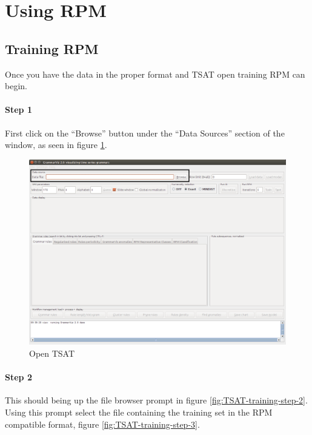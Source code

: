 \documentclass[letterpaper, 12pt]{article}
\begin{document}
\newpage
\section{Using RPM}

\subsection{Training RPM}
Once you have the data in the proper format and TSAT open training RPM can begin.

\paragraph{Step 1}
First click on the ``Browse'' button under the ``Data Sources'' section of the window, as seen in figure \ref{fig:TSAT-training-step-1}. 

\begin{figure}[h]
  \includegraphics[width=\textwidth]{TSAT-training-step-1}
  \caption{Open TSAT}
  \label{fig:TSAT-training-step-1}
\end{figure}
\newpage
\paragraph{Step 2}
This should being up the file browser prompt in figure \ref{fig:TSAT-training-step-2}. Using this prompt select the file containing the training set in the RPM compatible format, figure \ref{fig:TSAT-training-step-3}.
\end{document}
